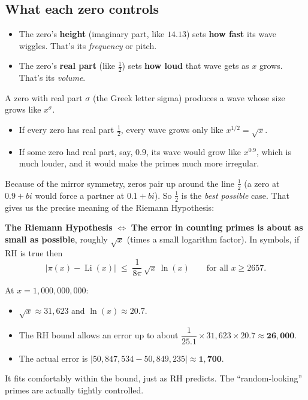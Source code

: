 \documentclass[11pt,a4paper]{article}
\newcommand{\Li}{\operatorname{Li}}
\begin{document}
\subsection*{What each zero controls}

\begin{itemize}[itemsep=2pt]
  \item The zero's \textbf{height} (imaginary part, like $14.13$) sets \textbf{how fast} its wave wiggles. That's its \emph{frequency} or pitch.
  \item The zero's \textbf{real part} (like $\tfrac12$) sets \textbf{how loud} that wave gets as $x$ grows. That's its \emph{volume}.
\end{itemize}

A zero with real part $\sigma$ (the Greek letter sigma) produces a wave whose size grows like $x^{\sigma}$.
\begin{itemize}[itemsep=2pt]
  \item If every zero has real part $\frac12$, every wave grows only like $x^{1/2} = \sqrt{x}$.
  \item If some zero had real part, say, $0.9$, its wave would grow like $x^{0.9}$, which is much louder, and it would make the primes much more irregular.
\end{itemize}

Because of the mirror symmetry, zeros pair up around the line $\frac12$ (a zero at $0.9 + bi$ would force a partner at $0.1 + bi$). So $\frac12$ is the \emph{best possible} case. That gives us the precise meaning of the Riemann Hypothesis:

\begin{keybox}
\textbf{The Riemann Hypothesis} $\iff$ \textbf{The error in counting primes is about as small as possible}, roughly $\sqrt{x}$ (times a small logarithm factor). In symbols, if RH is true then
\[
\big|\pi(x) - \Li(x)\big| \;\le\; \frac{1}{8\pi}\,\sqrt{x}\,\ln(x) \qquad \text{for all } x \ge 2657.
\]
\end{keybox}

\begin{example}
At $x = 1{,}000{,}000{,}000$:
\begin{itemize}[itemsep=1pt,leftmargin=*]
  \item $\sqrt{x} \approx 31{,}623$ and $\ln(x) \approx 20.7$.
  \item The RH bound allows an error up to about $\dfrac{1}{25.1}\times 31{,}623 \times 20.7 \approx \mathbf{26{,}000}$.
  \item The actual error is $|50{,}847{,}534 - 50{,}849{,}235| \approx \mathbf{1{,}700}$.
\end{itemize}
It fits comfortably within the bound, just as RH predicts. The ``random-looking'' primes are actually tightly controlled.
\end{example}
\end{document}
